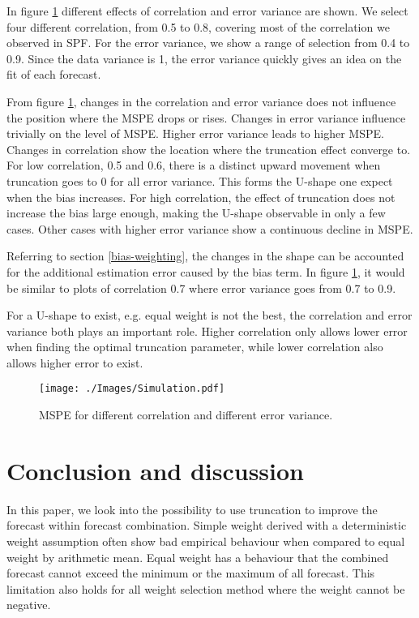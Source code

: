 \documentclass[11pt]{article}
\begin{document}
In figure \ref{fig: simulation} different effects of correlation and error variance are shown. We select four different correlation, from 0.5 to 0.8, covering most of the correlation we observed in SPF. For the error variance, we show a range of selection from 0.4 to 0.9. Since the data variance is 1, the error variance quickly gives an idea on the fit of each forecast. 

From figure \ref{fig: simulation}, changes in the correlation and error variance does not influence the position where the MSPE drops or rises. Changes in error variance influence trivially on the level of MSPE. Higher error variance leads to higher MSPE. Changes in correlation show the location where the truncation effect converge to. For low correlation, 0.5 and 0.6, there is a distinct upward movement when truncation goes to 0 for all error variance. This forms the U-shape one expect when the bias increases. For high correlation, the effect of truncation does not increase the bias large enough, making the U-shape observable in only a few cases. Other cases with higher error variance show a continuous decline in MSPE. 

Referring to section \ref{bias-weighting}, the changes in the shape can be accounted for the additional estimation error caused by the bias term. In figure \ref{fig: simulation}, it would be similar to plots of correlation 0.7 where error variance goes from 0.7 to 0.9.

For a U-shape to exist, e.g. equal weight is not the best, the correlation and error variance both plays an important role. Higher correlation only allows lower error when finding the optimal truncation parameter, while lower correlation also allows higher error to exist.

\begin{figure}[!h]
	\centering
	\texttt{[image: ./Images/Simulation.pdf]}
	\caption{MSPE for different correlation and different error variance.}\label{fig: simulation}
\end{figure}

\section{Conclusion and discussion}\label{conclusion}
In this paper, we look into the possibility to use truncation to improve the forecast within forecast combination. Simple weight derived with a deterministic weight assumption often show bad empirical behaviour when compared to equal weight by arithmetic mean. Equal weight has a behaviour that the combined forecast cannot exceed the minimum or the maximum of all forecast. This limitation also holds for all weight selection method where the weight cannot be negative. 
\end{document}
